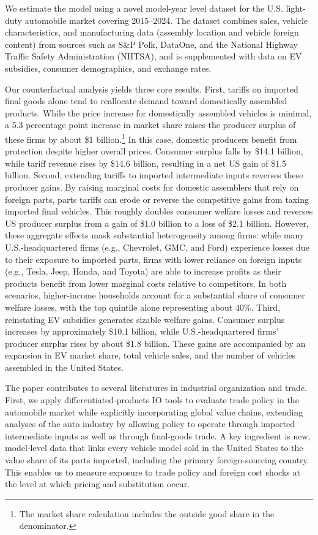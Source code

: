 \documentclass[11pt]{article}
\begin{document}
We estimate the model using a novel model-year level dataset for the U.S. light-duty automobile market covering 2015–2024. The dataset combines sales, vehicle characteristics, and manufacturing data (assembly location and vehicle foreign content) from sources such as S\&P Polk, DataOne, and the National Highway Traffic Safety Administration (NHTSA), and is supplemented with data on EV subsidies, consumer demographics, and exchange rates.

Our counterfactual analysis yields three core results. First, tariffs on imported final goods alone tend to reallocate demand toward domestically assembled products. While the price increase for domestically assembled vehicles is minimal, a 5.3 percentage point increase in market share raises the producer surplus of these firms by about \$1 billion.\footnote{The market share calculation includes the outside good share in the denominator.} In this case, domestic producers benefit from protection despite higher overall prices. Consumer surplus falls by \$14.1 billion, while tariff revenue rises by \$14.6 billion, resulting in a net US gain of \$1.5 billion. Second, extending tariffs to imported intermediate inputs reverses these producer gains. By raising marginal costs for domestic assemblers that rely on foreign parts, parts tariffs can erode or reverse the competitive gains from taxing imported final vehicles. This roughly doubles consumer welfare losses and reverses US producer surplus from a gain of \$1.0 billion to a loss of \$2.1 billion. However, these aggregate effects mask substantial heterogeneity among firms: while many U.S.-headquartered firms (e.g., Chevrolet, GMC, and Ford) experience losses due to their exposure to imported parts, firms with lower reliance on foreign inputs (e.g., Tesla, Jeep, Honda, and Toyota) are able to increase profits as their products benefit from lower marginal costs relative to competitors. In both scenarios, higher-income households account for a substantial share of consumer welfare losses, with the top quintile alone representing about 40\%. Third, reinstating EV subsidies generates sizable welfare gains. Consumer surplus increases by approximately \$10.1 billion, while U.S.-headquartered firms’ producer surplus rises by about \$1.8 billion. These gains are accompanied by an expansion in EV market share, total vehicle sales, and the number of vehicles assembled in the United States.

The paper contributes to several literatures in industrial organization and trade. First, we apply differentiated-products IO tools to evaluate trade policy in the automobile market while explicitly incorporating global value chains, extending analyses of the auto industry \citep{berry_automobile_1995, grieco_evolution_2024} by allowing policy to operate through imported intermediate inputs as well as through final-goods trade. A key ingredient is new, model-level data that links every vehicle model sold in the United States to the value share of its parts imported, including the primary foreign-sourcing country. This enables us to measure exposure to trade policy and foreign cost shocks at the level at which pricing and substitution occur.
\end{document}

